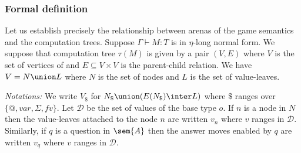 \subsubsection{Formal definition}

Let us establish precisely the relationship between arenas of the
game semantics and the computation trees. Suppose $\Gamma \vdash M : T$
is in $\eta$-long normal form. We suppose that computation tree $\tau(M)$
is given by a pair $(V,E)$ where $V$ is the set of vertices of
and $E \subseteq V \times V$ is the parent-child relation. We have $V = N \union L$ where $N$
is the set of nodes and $L$ is the set of value-leaves.

\emph{Notations:}
We write $V_\$$ for $N_\$ \union (E(N_\$) \inter L)$ where $\$$ ranges over $\{@, var, \Sigma, fv \}$.
Let $\mathcal{D}$ be the set of values of the base type $o$. If $n$ is a node in $N$ then the value-leaves attached to the node $n$ are written $v_n$ where $v$ ranges in $\mathcal{D}$.
Similarly, if $q$ is a question in $\sem{A}$ then the answer moves enabled by $q$ are written $v_q$ where $v$ ranges in $\mathcal{D}$.

